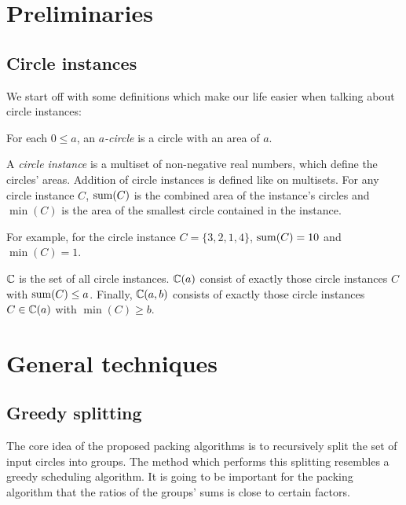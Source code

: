 \documentclass[%
    a4paper,              %
    style=screen,          %
    bibliography=totoc,   %
    nexus,                %
    lnum,                 %
    extramargin,          %
]{tubsbook}
\begin{document}
\chapter{Preliminaries}

\section{Circle instances}

We start off with some definitions which make our life easier when talking about circle instances:

\begin{definition}
    For each $0 \le a$, an \emph{$a$-circle} is a circle with an area of $a$.
\end{definition}

\begin{definition}
    A \emph{circle instance} is a multiset of non-negative real numbers, which define the circles' areas. Addition of circle instances is defined like on multisets.
    For any circle instance $C$, $\operatorname{sum}(C)$ is the combined area of the instance's circles and $\min(C)$ is the area of the smallest circle contained in the instance.
\end{definition}

For example, for the circle instance $C = \{3,2,1,4\}$, $\operatorname{sum}(C) = 10$ and $\min(C) = 1$.

\begin{definition}
    $\mathbb{C}$ is the set of all circle instances. $\mathbb{C}(a)$ consist of exactly those circle instances $C$ with $\operatorname{sum}(C) \le a$. Finally, $\mathbb{C}(a,b)$ consists of exactly those circle instances $C \in \mathbb{C}(a)$ with $\min(C) \ge b$.
\end{definition}

\chapter{General techniques}

\section{Greedy splitting}

The core idea of the proposed packing algorithms is to recursively split the set of input circles into groups. The method which performs this splitting resembles a greedy scheduling algorithm. It is going to be important for the packing algorithm that the ratios of the groups' sums is close to certain factors.
\end{document}
